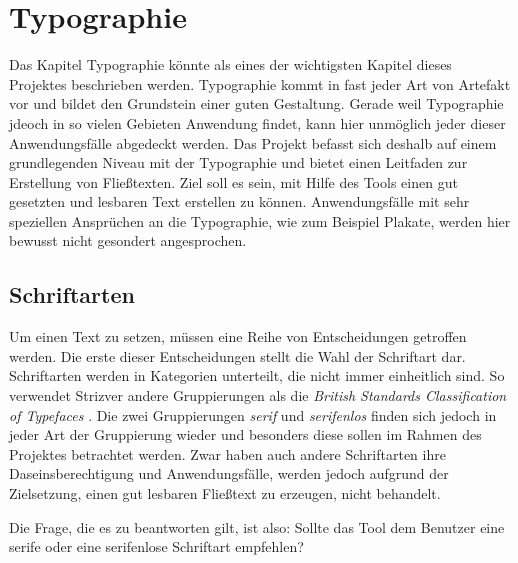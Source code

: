 
\chapter{Typographie} %

\label{Typographie} %



Das Kapitel Typographie könnte als eines der wichtigsten Kapitel dieses Projektes beschrieben werden. Typographie kommt in fast jeder Art von Artefakt vor und bildet den Grundstein einer guten Gestaltung. Gerade weil Typographie jdeoch in so vielen Gebieten Anwendung findet, kann hier unmöglich jeder dieser Anwendungsfälle abgedeckt werden.
Das Projekt befasst sich deshalb auf einem grundlegenden Niveau mit der Typographie und bietet einen Leitfaden zur Erstellung von Fließtexten. Ziel soll es sein, mit Hilfe des Tools einen gut gesetzten und lesbaren Text erstellen zu können.
Anwendungsfälle mit sehr speziellen Ansprüchen an die Typographie, wie zum Beispiel Plakate, werden hier bewusst nicht gesondert angesprochen.

\section{Schriftarten}
Um einen Text zu setzen, müssen eine Reihe von Entscheidungen getroffen werden. Die erste dieser Entscheidungen stellt die Wahl der Schriftart dar.
Schriftarten werden in Kategorien unterteilt, die nicht immer einheitlich sind. So verwendet Strizver \cite{strizver2014type} andere Gruppierungen als  die \textit{British Standards Classification of Typefaces} \cite[S. 51]{baines2005type}. Die zwei Gruppierungen \textit{serif} und \textit{serifenlos} finden sich jedoch in jeder Art der Gruppierung wieder und besonders diese sollen im Rahmen des Projektes betrachtet werden.
Zwar haben auch andere Schriftarten ihre Daseinsberechtigung und Anwendungsfälle, werden jedoch aufgrund der Zielsetzung, einen gut lesbaren Fließtext zu erzeugen, nicht behandelt.

Die Frage, die es zu beantworten gilt, ist also: Sollte das Tool dem Benutzer eine serife oder eine serifenlose Schriftart empfehlen?

